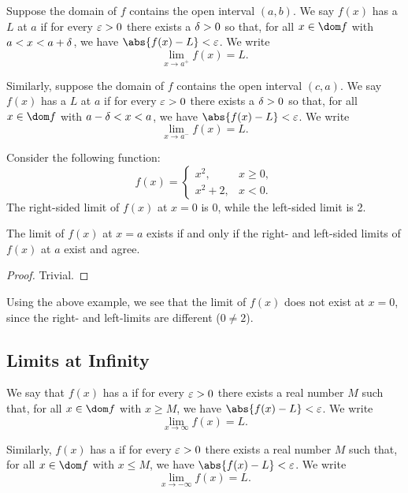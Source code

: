 \begin{definition}
    Suppose the domain of $f$ contains the open interval $(a, b)$. We say $f(x)$ has a  $L$ at $a$ if for every $\varepsilon > 0$ there exists a $\delta > 0$ so that, for all $x \in \dom f$ with $a < x < a + \delta$, we have $\abs{f(x) - L} < \ve$. We write \[\lim_{x \to a^+} f(x) = L.\]

    Similarly, suppose the domain of $f$ contains the open interval $(c, a)$. We say $f(x)$ has a  $L$ at $a$ if for every $\varepsilon > 0$ there exists a $\delta > 0$ so that, for all $x \in \dom f$ with $a - \delta < x < a$, we have $\abs{f(x) - L} < \ve$. We write \[\lim_{x \to a^-} f(x) = L.\]
\end{definition}

\begin{example}
    Consider the following function: \[f(x) = \begin{cases}x^2, & x \geq 0,\\ x^2 + 2, & x < 0.\end{cases}\] The right-sided limit of $f(x)$ at $x = 0$ is 0, while the left-sided limit is 2.
\end{example}

\begin{proposition}
    The limit of $f(x)$ at $x = a$ exists if and only if the right- and left-sided limits of $f(x)$ at $a$ exist and agree.
\end{proposition}
\begin{proof}
    Trivial.
\end{proof}

Using the above example, we see that the limit of $f(x)$ does not exist at $x = 0$, since the right- and left-limits are different ($0 \neq 2$).

\subsection{Limits at Infinity}

\begin{definition}
    We say that $f(x)$ has a  if for every $\varepsilon > 0$ there exists a real number $M$ such that, for all $x \in \dom f$ with $x \geq M$, we have $\abs{f(x) - L} < \ve$. We write \[\lim_{x \to \infty} f(x) = L.\]
    
    Similarly, $f(x)$ has a  if for every $\varepsilon > 0$ there exists a real number $M$ such that, for all $x \in \dom f$ with $x \leq M$, we have $\abs{f(x) - L} < \ve$. We write \[\lim_{x \to -\infty} f(x) = L.\]
\end{definition}

